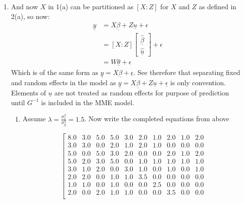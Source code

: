 \documentclass[12pt,a4paper]{paper}
\begin{document}
\begin{enumerate}
\[\begin{array}{c}
  680 \\ 
  500 \\ 
  800 \\ 
  895 \\ 
  775 \\ 
  600 \\ 
  715 \\ \end{array}\right]
\]
\item And now $X$ in 1(a) can be partitioned as $\left[X : Z\right]$ for $X$ and $Z$ as defined in 2(a), so now:
\begin{align*}
\underline{y} &= X\underline{\beta} + Z\underline{u} + \epsilon\\
&= \left[X:Z\right]\left[\begin{array}{c}\underline{\hat{\beta}}\\\underline{\hat{u}}\end{array}\right] + \epsilon \\
&= W\underline{\theta} + \epsilon
\end{align*}
Which is of the same form as $\underline{y} = X\underline{\beta} + \underline{\epsilon}$. See therefore that separating fixed and random effects in the model as $\underline{y} = X\underline{\beta} + Z\underline{u} + \underline{\epsilon}$ is only convention. Elements of $\underline{u}$ are not treated as random effects for purpose of prediction until $G^{-1}$ is included in the MME model. 
\begin{enumerate}
\item Assume $\lambda = \frac{\sigma^{2}_{\epsilon}}{\sigma^{2}_{g}} = 1.5$. Now write the completed equations from above
\begin{small}
\[
\left[\begin{array}{cccccccccc}
8.0 & 3.0 & 5.0 & 5.0 & 3.0 & 2.0 & 1.0 & 2.0 & 1.0 & 2.0 \\ 
  3.0 & 3.0 & 0.0 & 2.0 & 1.0 & 2.0 & 1.0 & 0.0 & 0.0 & 0.0 \\ 
  5.0 & 0.0 & 5.0 & 3.0 & 2.0 & 0.0 & 0.0 & 2.0 & 1.0 & 2.0 \\ 
  5.0 & 2.0 & 3.0 & 5.0 & 0.0 & 1.0 & 1.0 & 1.0 & 1.0 & 1.0 \\ 
  3.0 & 1.0 & 2.0 & 0.0 & 3.0 & 1.0 & 0.0 & 1.0 & 0.0 & 1.0 \\ 
  2.0 & 2.0 & 0.0 & 1.0 & 1.0 & 3.5 & 0.0 & 0.0 & 0.0 & 0.0 \\ 
  1.0 & 1.0 & 0.0 & 1.0 & 0.0 & 0.0 & 2.5 & 0.0 & 0.0 & 0.0 \\ 
  2.0 & 0.0 & 2.0 & 1.0 & 1.0 & 0.0 & 0.0 & 3.5 & 0.0 & 0.0 \\ 

\end{array}\]
\end{small}
\end{enumerate}
\end{enumerate}
\end{document}
